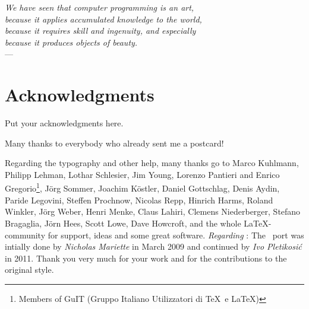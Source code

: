 
\begin{flushright}{\slshape
    We have seen that computer programming is an art, \\
    because it applies accumulated knowledge to the world, \\
    because it requires skill and ingenuity, and especially \\
    because it produces objects of beauty.} \\ \medskip
    ---  \citep{knuth:1974}
\end{flushright}
\bigskip
\begingroup
\let\clearpage\relax
\let\cleardoublepage\relax
\let\cleardoublepage\relax
\chapter*{Acknowledgments}
Put your acknowledgments here.

Many thanks to everybody who already sent me a postcard!

Regarding the typography and other help, many thanks go to Marco 
Kuhlmann, Philipp Lehman, Lothar Schlesier, Jim Young, Lorenzo 
Pantieri and Enrico Gregorio\footnote{Members of GuIT (Gruppo 
Italiano Utilizzatori di \TeX\ e \LaTeX )}, J\"org Sommer, 
Joachim K\"ostler, Daniel Gottschlag, Denis Aydin, Paride 
Legovini, Steffen Prochnow, Nicolas Repp, Hinrich Harms, 
Roland Winkler, Jörg Weber, Henri Menke, Claus Lahiri, 
Clemens Niederberger, Stefano Bragaglia, Jörn Hees, 
Scott Lowe, Dave Howcroft, 
and the whole \LaTeX-community for support, ideas and 
some great software.
\bigskip
\noindent\emph{Regarding \mLyX}: The \mLyX\ port was intially done by
\emph{Nicholas Mariette} in March 2009 and continued by
\emph{Ivo Pletikosi\'c} in 2011. Thank you very much for your
work and for the contributions to the original style.
\endgroup

